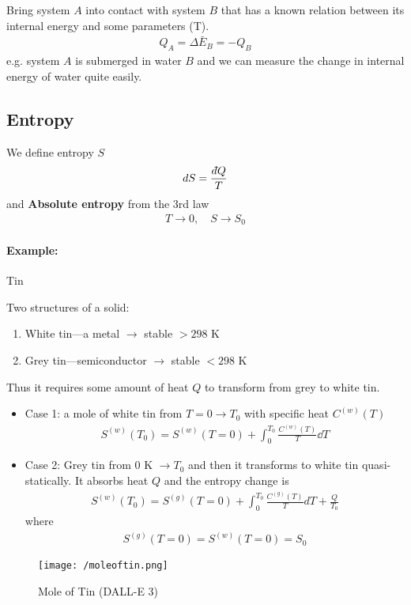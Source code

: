 \documentclass[../main.tex]{subfiles}
\begin{document}
Bring system $A$ into contact with system $B$ that has a known relation between its internal energy and some parameters (T).
\begin{align*}
    Q_A = \Delta \bar E_B = -Q_B
\end{align*}
e.g. system $A$ is submerged in water $B$ and we can measure the change in internal energy of water quite easily.

\subsection{Entropy} 

We define entropy $S$
\begin{align*}
    dS = \frac{d\hspace*{-0.08em}\bar{}\hspace*{0.1em} Q}{T}
\end{align*}
and \textbf{Absolute entropy} from the 3rd law
\begin{align*}
    T \to 0,\quad S \to S_0
\end{align*}

\paragraph{Example:} Tin

Two structures of a solid:
\begin{enumerate}
    \item White tin---a metal $\to$ stable $> 298$ K
    \item Grey tin---semiconductor $\to$ stable $< 298$ K
\end{enumerate}
Thus it requires some amount of heat $Q$ to transform from grey to white tin.
\begin{itemize}
    \item Case 1: a mole of white tin from $T=0 \to T_0$ with specific heat $C^{(w)}(T)$
    \begin{align*}
        S^{(w)} (T_0) = S^{(w)}(T = 0) + \int_0^{T_0} \frac{C^{(w)}(T)}{T} \dd T
    \end{align*}
    \item Case 2: Grey tin from $0$ K $\to T_0$ and then it transforms to white tin quasi-statically.
    It absorbs heat $Q$ and the entropy change is
    \begin{align*}
        S^{(w)}(T_0) = S^{(g)}(T=0) + \int_0^{T_0} \frac{C^{(g)} (T)}{T} dT + \frac{Q}{T_0}
    \end{align*}
    where
    \begin{align*}
        S^{(g)}(T=0) = S^{(w)}(T=0) = S_0
    \end{align*}
\end{itemize}

\begin{figure*}[ht]
    \centering
    \texttt{[image: /moleoftin.png]}
    \caption{Mole of Tin (DALL-E 3)}
    \label{fig:moleoftin}
\end{figure*}
\end{document}
